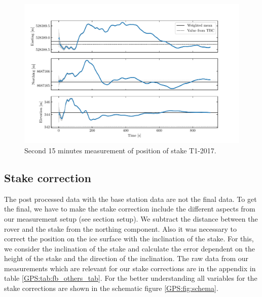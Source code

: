 \begin{figure}[H]
    \centering
    \includegraphics[width=\textwidth]{./figs/timeseries/46250723_corr-T1-ii-2017_Timeseries-east-north-elev.pdf}
    \caption{Second 15 minutes measurement of position of stake T1-2017.}
    \label{GPS:fig:T1-ii_timeseries}
\end{figure}


\subsection{Stake correction}
The post processed data with the base station data are not the final data. 
To get the final, we have to make the stake correction include the different aspects from our measurement setup (see section setup).
We subtract the distance between the rover and the stake from the northing component.
Also it was necessary to correct the position on the ice surface with the inclination of the stake. 
For this, we consider the inclination of the stake and calculate the error dependent on the height of the stake and the direction of the inclination.
The raw data from our measurements which are relevant for our stake corrections are in the appendix in table \ref{GPS:tab:fb_others_tab}.
For the better understanding all variables for the stake corrections are shown in the schematic figure \ref{GPS:fig:schema}.
\medskip

